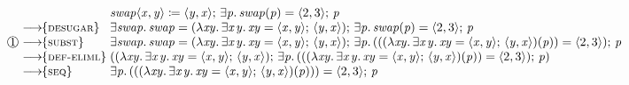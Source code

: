 \documentclass[acmsmall,review,dvipsnames]{acmart}
\newcommand{\Varid}[1]{\mathit{#1}}
\newcommand{\rulename}[1]{\textsc{\small #1}}
\newcommand{\movesto}{\longrightarrow}
\newcommand{\movestoC}[1]{\movesto\!\!\{#1\}}
\newcommand{\movestoR}[1]{\movestoC{\rulename{#1}}}
\begin{document}
\begin{figure}
\begin{scriptsize}
\setlength{\abovedisplayskip}{0pt}%
\setlength{\belowdisplayskip}{0pt}%
$$
\begin{array}{@{}l@{\;}l@{\;}l@{}}
               &                           & \ensuremath{\Varid{swap}\langle\Varid{x},\Varid{y}\rangle\mathrel{\coloneqq}\langle{}\Varid{y},\Varid{x}\rangle;\,\exists\Varid{p}.\,\Varid{swap}(\Varid{p})\mathrel{=}\langle{}\mathrm{2},\mathrm{3}\rangle;\,\Varid{p}} \\
               & \movestoR{desugar}        & \ensuremath{\exists\Varid{swap}.\,\Varid{swap}\mathrel{=}(\lambda\Varid{xy}.\,\exists\Varid{x}\hspace{0.3mm}\Varid{y}.\,\Varid{xy}\mathrel{=}\langle{}\Varid{x},\Varid{y}\rangle;\,\langle{}\Varid{y},\Varid{x}\rangle);\,\exists\Varid{p}.\,\Varid{swap}(\Varid{p})\mathrel{=}\langle{}\mathrm{2},\mathrm{3}\rangle;\,\Varid{p}} \\
\circlednum{1} & \movestoR{subst}          & \ensuremath{\exists\Varid{swap}.\,\Varid{swap}\mathrel{=}(\lambda\Varid{xy}.\,\exists\Varid{x}\hspace{0.3mm}\Varid{y}.\,\Varid{xy}\mathrel{=}\langle{}\Varid{x},\Varid{y}\rangle;\,\langle{}\Varid{y},\Varid{x}\rangle);\,\exists\Varid{p}.\,(((\lambda\Varid{xy}.\,\exists\Varid{x}\hspace{0.3mm}\Varid{y}.\,\Varid{xy}\mathrel{=}\langle{}\Varid{x},\Varid{y}\rangle;\,\langle{}\Varid{y},\Varid{x}\rangle)(\Varid{p}))\mathrel{=}\langle{}\mathrm{2},\mathrm{3}\rangle);\,\Varid{p}} \\
               & \movestoR{def-eliml}      & \ensuremath{((\lambda\Varid{xy}.\,\exists\Varid{x}\hspace{0.3mm}\Varid{y}.\,\Varid{xy}\mathrel{=}\langle{}\Varid{x},\Varid{y}\rangle;\,\langle{}\Varid{y},\Varid{x}\rangle);\,\exists\Varid{p}.\,(((\lambda\Varid{xy}.\,\exists\Varid{x}\hspace{0.3mm}\Varid{y}.\,\Varid{xy}\mathrel{=}\langle{}\Varid{x},\Varid{y}\rangle;\,\langle{}\Varid{y},\Varid{x}\rangle)(\Varid{p}))\mathrel{=}\langle{}\mathrm{2},\mathrm{3}\rangle);\,\Varid{p})} \\
               & \movestoR{seq}            & \ensuremath{\exists\Varid{p}.\,(((\lambda\Varid{xy}.\,\exists\Varid{x}\hspace{0.3mm}\Varid{y}.\,\Varid{xy}\mathrel{=}\langle{}\Varid{x},\Varid{y}\rangle;\,\langle{}\Varid{y},\Varid{x}\rangle)(\Varid{p})))\mathrel{=}\langle{}\mathrm{2},\mathrm{3}\rangle;\,\Varid{p}} \\

\end{array}$$
\end{scriptsize}
\end{figure}
\end{document}
